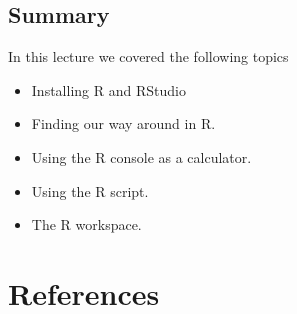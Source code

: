 \documentclass[]{book}
\providecommand{\tightlist}{%
  \setlength{\itemsep}{0pt}\setlength{\parskip}{0pt}}
\begin{document}
\hypertarget{summary-14}{%
\section{Summary}\label{summary-14}}

In this lecture we covered the following topics

\begin{itemize}
\tightlist
\item
  Installing R and RStudio
\item
  Finding our way around in R.
\item
  Using the R console as a calculator.
\item
  Using the R script.
\item
  The R workspace.
\end{itemize}

\hypertarget{references}{%
\chapter*{References}\label{references}}


\end{document}
